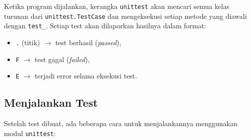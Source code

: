 Ketika program dijalankan, kerangka \texttt{unittest} akan mencari semua kelas turunan dari \texttt{unittest.TestCase} dan mengeksekusi setiap metode yang diawali dengan \texttt{test\_}.  
Setiap test akan dilaporkan hasilnya dalam format:
\begin{itemize}
    \item \texttt{.} (titik) $\rightarrow$ test berhasil (\textit{passed}),
    \item \texttt{F} $\rightarrow$ test gagal (\textit{failed}),
    \item \texttt{E} $\rightarrow$ terjadi error selama eksekusi test.
\end{itemize}

\subsection{Menjalankan Test}

Setelah test dibuat, ada beberapa cara untuk menjalankannya menggunakan modul \texttt{unittest}:

